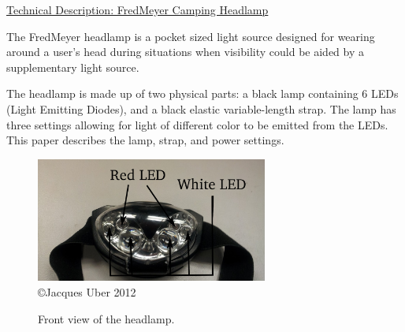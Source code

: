 \documentclass[12pt]{article}
\def\title{Technical Description: FredMeyer Camping Headlamp}
\begin{document}
\begin{center}
\underline{
\large{\title}
}
\end{center}

\singlespacing
The FredMeyer headlamp is a pocket sized light source designed for wearing around a user's head during
situations when visibility could be aided by a supplementary light source.

The headlamp is made up of two physical parts: a black lamp containing 6 LEDs (Light Emitting
Diodes), and a black elastic variable-length strap. The lamp has three settings allowing for light
of different color to be emitted from the LEDs. This paper describes the lamp, strap, and power
settings.

\begin{figure}[h!]
\centering
\label{Figure Derp}
\caption[Front view of the headlamp] {Front view of the headlamp.}
\label{fig:DERP}
\includegraphics[width=3in]{headlamp}
\\ {\tiny \copyright  Jacques Uber 2012}
\end{figure}
\end{document}
